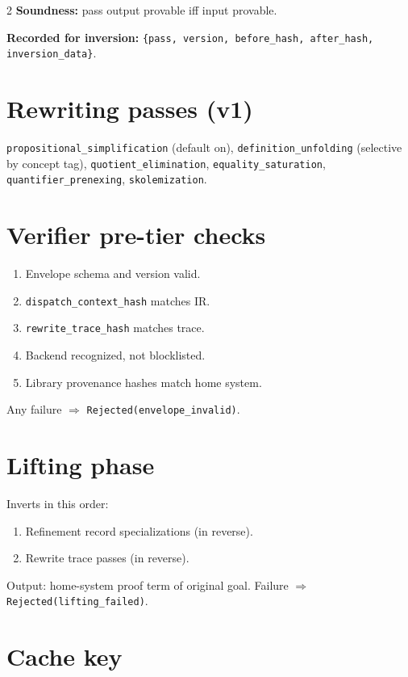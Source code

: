 \documentclass[10pt,letterpaper]{article}
\begin{document}
\begin{multicols}{2}
\textbf{Soundness:} pass output provable iff input provable.

\textbf{Recorded for inversion:}
\texttt{\{pass, version, before\_hash, after\_hash, inversion\_data\}}.

\section{Rewriting passes (v1)}

\noindent\texttt{propositional\_simplification} (default on),
\texttt{definition\_unfolding} (selective by concept tag),
\texttt{quotient\_elimination},
\texttt{equality\_saturation},
\texttt{quantifier\_prenexing},
\texttt{skolemization}.

\section{Verifier pre-tier checks}

\begin{enumerate}
  \item Envelope schema and version valid.
  \item \texttt{dispatch\_context\_hash} matches IR.
  \item \texttt{rewrite\_trace\_hash} matches trace.
  \item Backend recognized, not blocklisted.
  \item Library provenance hashes match home system.
\end{enumerate}

Any failure $\Rightarrow$ \texttt{Rejected(envelope\_invalid)}.

\section{Lifting phase}

Inverts in this order:
\begin{enumerate}
  \item Refinement record specializations (in reverse).
  \item Rewrite trace passes (in reverse).
\end{enumerate}

Output: home-system proof term of original goal.
Failure $\Rightarrow$ \texttt{Rejected(lifting\_failed)}.

\section{Cache key}


\end{multicols}
\end{document}
